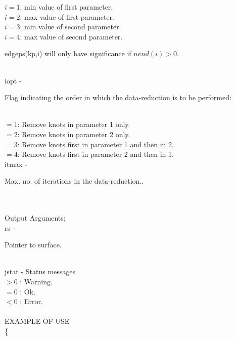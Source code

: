           \>\>\>\> $i=1$: min value of first parameter.\\ 
          \>\>\>\> $i=2$: max value of first parameter.\\
          \>\>\>\> $i=3$: min value of second parameter.\\
          \>\>\>\> $i=4$: max value of second parameter.\\
          \>\>\>\>  \begin{minipg2}
                  edgeps(kp,i) will only have significance if $nend(i)>0$.
                               \end{minipg2}\\[0.8ex]
        \>\>    {\fov iopt}\> - \>  \begin{minipg2}
                  Flag indicating the order in which the data-reduction
                  is to be performed:
                               \end{minipg2}\\[0.8ex]
          \>\>\>\> $=1$: Remove knots in parameter 1 only.\\
          \>\>\>\> $=2$: Remove knots in parameter 2 only.\\
          \>\>\>\> $=3$: Remove knots first in parameter 1 and then in 2.\\
          \>\>\>\> $=4$: Remove knots first in parameter 2 and then in 1.\\
        \>\>    {\fov itmax}\> - \>  \begin{minipg2}
                    Max. no. of iterations in the data-reduction..
                               \end{minipg2}\\[0.8ex]
\\
	\>Output Arguments:\\
        \>\>    {\fov rs}\> - \>  \begin{minipg2}
                     Pointer to surface.
                               \end{minipg2}\\
        \>\>    {\fov jstat}     \> - \> Status messages\\
                \>\>\>\>\>              $> 0$   : Warning.\\
                \>\>\>\>\>              $= 0$   : Ok.\\
                \>\>\>\>\>              $< 0$   : Error.\\
\\
EXAMPLE OF USE\\
		\>      \{ \\

